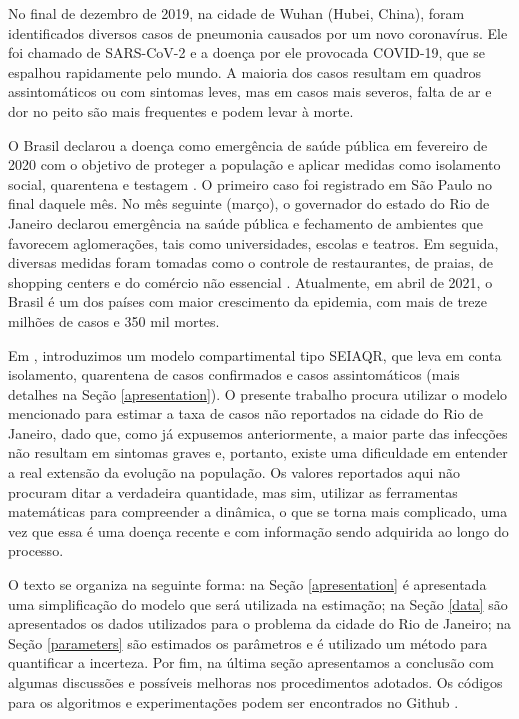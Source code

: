 No final de dezembro de 2019, na cidade de Wuhan (Hubei, China), foram identificados diversos casos de pneumonia \cite{sars-cov-2} causados por um novo coronavírus. 
Ele foi chamado de SARS-CoV-2 e a doença por ele provocada COVID-19, que se espalhou rapidamente pelo mundo. 
A maioria dos casos resultam em quadros assintomáticos ou com sintomas leves, mas em casos mais severos, falta de ar e dor no peito são mais frequentes \cite{oms-symptoms} e podem levar à morte. 

O Brasil declarou a doença como emergência de saúde pública em fevereiro de 2020 com o objetivo de proteger a população e aplicar medidas como isolamento social, quarentena e testagem \cite{croda2020}. 
O primeiro caso foi registrado em São Paulo no final daquele mês. 
No mês seguinte (março), o governador do estado do Rio de Janeiro declarou emergência na saúde pública e fechamento de ambientes que favorecem aglomerações, tais como universidades, escolas e teatros.
Em seguida, diversas medidas foram tomadas como o controle de restaurantes, de praias, de shopping centers e do comércio não essencial \cite{dantas2020}. 
Atualmente, em abril de 2021, o Brasil é um dos países com maior crescimento da epidemia, com mais de treze milhões de
casos e 350 mil mortes. 

Em \cite{aronna2021}, introduzimos um modelo compartimental tipo SEIAQR, que leva em conta isolamento, quarentena de casos confirmados e casos assintomáticos (mais detalhes na Seção \ref{apresentation}). 
O presente trabalho procura utilizar o modelo mencionado para estimar a taxa de casos não reportados na cidade do Rio de Janeiro, dado que, como já expusemos anteriormente, a maior parte das infecções não resultam em sintomas graves e, portanto, existe uma dificuldade em entender a real extensão da evolução na população.
Os valores reportados aqui não procuram ditar a verdadeira quantidade, mas sim, utilizar as ferramentas matemáticas para compreender a dinâmica, o que se torna mais complicado, uma vez que essa é uma doença recente e com informação sendo adquirida ao longo do processo.

O texto se organiza na seguinte forma: na Seção \ref{apresentation} é apresentada uma simplificação do modelo que será utilizada na estimação; na Seção \ref{data} são apresentados os dados utilizados para o problema da cidade do Rio de Janeiro; na Seção \ref{parameters} são estimados os parâmetros e é utilizado um método para quantificar a incerteza. 
Por fim, na última seção apresentamos a conclusão com algumas discussões e possíveis melhoras nos procedimentos adotados. Os códigos para os algoritmos e experimentações podem ser encontrados no Github \cite{github}. 